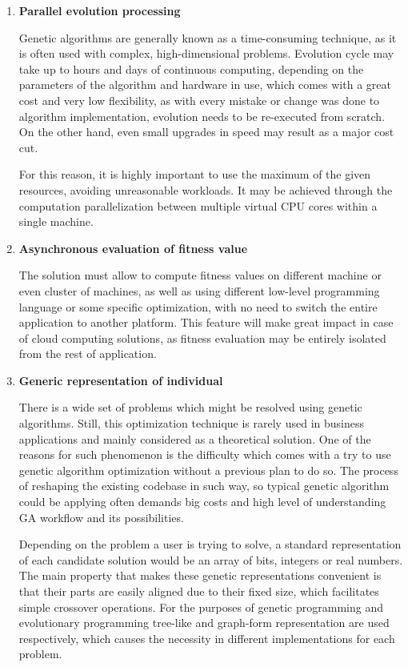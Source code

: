 \begin{enumerate}
\item \label{freq:par} \textbf{Parallel evolution processing}

Genetic algorithms are generally known as a time-consuming technique, as it is often used with complex, high-dimensional problems. Evolution cycle may take up to hours and days of continuous computing, depending on the parameters of the algorithm and hardware in use, which comes with a great cost and very low flexibility, as with every mistake or change was done to algorithm implementation, evolution needs to be re-executed from scratch. On the other hand, even small upgrades in speed may result as a major cost cut.

For this reason, it is highly important to use the maximum of the given resources, avoiding unreasonable workloads. It may be achieved through the computation parallelization between multiple virtual CPU cores within a single machine.
\medbreak

\item \label{freq:async} \textbf{Asynchronous evaluation of fitness value}

The solution must allow to compute fitness values on different machine or even cluster of machines, as well as using different low-level programming language or some specific optimization, with no need to switch the entire application to another platform. This feature will make great impact in case of cloud computing solutions, as fitness evaluation may be entirely isolated from the rest of application.
\medbreak

\item \label{freq:generic} \textbf{Generic representation of individual}

There is a wide set of problems which might be resolved using genetic algorithms. Still, this optimization technique is rarely used in business applications and mainly considered as a theoretical solution. One of the reasons for such phenomenon is the difficulty which comes with a try to use genetic algorithm optimization without a previous plan to do so. The process of reshaping the existing codebase in such way, so typical genetic algorithm could be applying often demands big costs and high level of understanding GA workflow and its possibilities.

Depending on the problem a user is trying to solve, a standard representation of each candidate solution would be an array of bits, integers or real numbers. The main property that makes these genetic representations convenient is that their parts are easily aligned due to their fixed size, which facilitates simple crossover operations. For the purposes of genetic programming and evolutionary programming tree-like and graph-form representation are used respectively, which causes the necessity in different implementations for each problem.


\end{enumerate}
